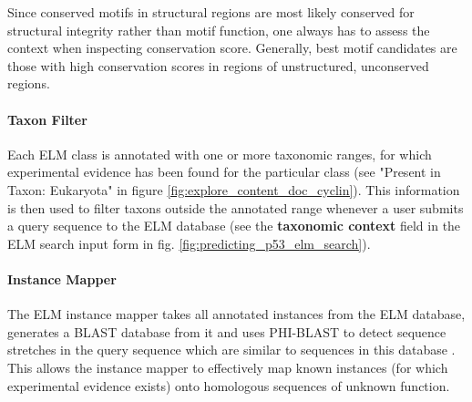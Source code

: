 \documentclass[12pt]{article}
\newcommand\button[1]{%
	\textbf{#1}%
}
\begin{document}
	Since conserved motifs in structural regions are most likely conserved for
	structural integrity rather than motif function, one always has to assess the
	context when inspecting conservation score. Generally, best motif candidates
	are those with high conservation scores in regions of unstructured, unconserved
	regions.



	\paragraph*{Taxon Filter}\label{TaxonFilter}

	Each ELM class is annotated with one or more taxonomic ranges, for which
	experimental evidence has been found for the particular class
	(see "Present in Taxon: Eukaryota" in figure
	\ref{fig:explore_content_doc_cyclin}). This information is then used to filter taxons
	outside the annotated range whenever a user submits a query sequence to the ELM
	database (see the \button{taxonomic context} field in the ELM search input form in fig.
	\ref{fig:predicting_p53_elm_search}).

	\paragraph*{Instance Mapper}\label{InstanceMapper}

	The ELM instance mapper takes all annotated instances from the ELM database,
	generates a BLAST database from it and uses PHI-BLAST
	to detect sequence stretches in
	the query sequence which are similar to sequences in this database \citep{9705509}. This allows
	the instance mapper to effectively map known instances (for which experimental
	evidence exists) onto homologous sequences of unknown function.

\end{document}
